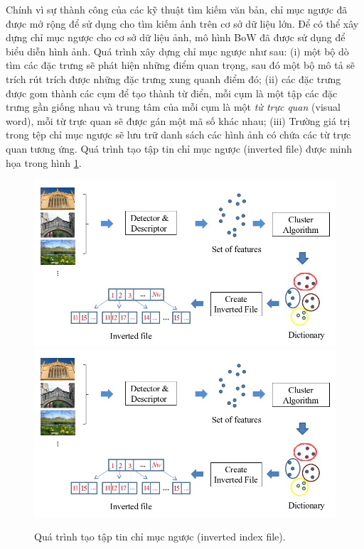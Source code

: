 Chính vì sự thành công của các kỹ thuật tìm kiếm văn bản, chỉ mục ngược đã được mở rộng để sử dụng cho tìm kiếm ảnh trên cơ sở dữ liệu lớn. Để có thể xây dựng chỉ mục ngược cho cơ sở dữ liệu ảnh, mô hình BoW đã được sử dụng để biểu diễn hình ảnh. Quá trình xây dựng chỉ mục ngược như sau: (i) một bộ dò tìm các đặc trưng sẽ phát hiện những điểm quan trọng, sau đó một bộ mô tả sẽ trích rút trích được những đặc trưng xung quanh điểm đó; (ii) các đặc trưng được gom thành các cụm để tạo thành từ điển, mỗi cụm là một tập các đặc trưng gần giống nhau và trung tâm của mỗi cụm là một \textit{từ trực quan} (visual word), mỗi từ trực quan sẽ được gán một mã số khác nhau; (iii) Trường giá trị trong tệp chỉ mục ngược sẽ lưu trữ danh sách các hình ảnh có chứa các từ trực quan tương ứng. Quá trình tạo tập tin chỉ mục ngược (inverted file) được minh họa trong hình \ref{FigInvertedFile}.

\begin{figure}[!htbp]
  \begin{center}
    \leavevmode
    \ifpdf
      \includegraphics[scale=0.51]{invertedFile}
    \else
      \includegraphics[scale=0.51]{invertedFile}
    \fi
    \caption[Quá trình tạo tập tin chỉ mục ngược]{Quá trình tạo tập tin chỉ mục ngược (inverted index file).}
    \label{FigInvertedFile}
  \end{center}
\end{figure}

